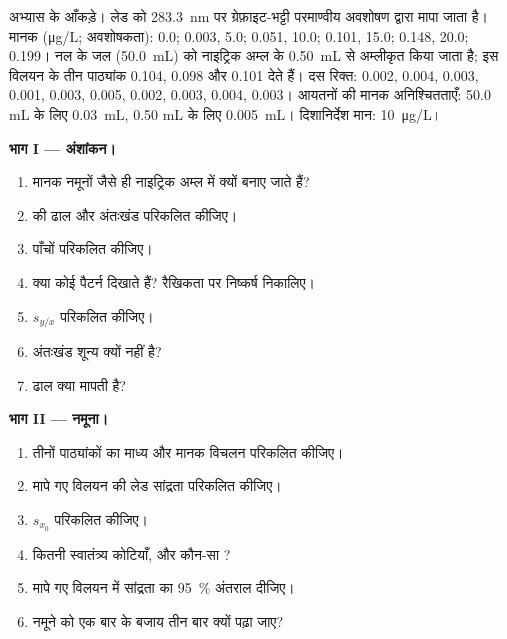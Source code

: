 \begin{problem}
\label{pb:b2:measurement-statistics:1}
अभ्यास के आँकड़े। लेड को \qty{283.3}{nm} पर ग्रेफ़ाइट-भट्टी परमाण्वीय अवशोषण द्वारा मापा जाता है। मानक
(\unit{\micro g/L}; अवशोषकता): 0.0; 0.003, 5.0; 0.051, 10.0; 0.101, 15.0; 0.148, 20.0; 0.199। नल
के जल (\qty{50.0}{mL}) को नाइट्रिक अम्ल के \qty{0.50}{mL} से अम्लीकृत किया जाता है; इस विलयन के तीन पाठ्यांक
0.104, 0.098 और 0.101 देते हैं। दस रिक्त: 0.002, 0.004, 0.003, 0.001, 0.003, 0.005, 0.002,
0.003, 0.004, 0.003। आयतनों की मानक अनिश्चितताएँ: 50.0 mL के लिए \qty{0.03}{mL},
0.50 mL के लिए \qty{0.005}{mL}। दिशानिर्देश मान: \qty{10}{\micro g/L}।

\medskip
\noindent\textbf{भाग I --- अंशांकन।}
\begin{enumerate}
  \item मानक नमूनों जैसे ही नाइट्रिक अम्ल में क्यों बनाए जाते हैं?
  \item {} की ढाल और अंतःखंड परिकलित कीजिए।
  \item पाँचों  परिकलित कीजिए।
  \item क्या  कोई पैटर्न दिखाते हैं? रैखिकता पर निष्कर्ष निकालिए।
  \item $s_{y/x}$ परिकलित कीजिए।
  \item अंतःखंड शून्य क्यों नहीं है?
  \item ढाल क्या मापती है?
\end{enumerate}

\medskip
\noindent\textbf{भाग II --- नमूना।}
\begin{enumerate}[resume]
  \item तीनों पाठ्यांकों का माध्य और मानक विचलन परिकलित कीजिए।
  \item मापे गए विलयन की लेड सांद्रता परिकलित कीजिए।
  \item $s_{x_0}$ परिकलित कीजिए।
  \item कितनी स्वातंत्र्य कोटियाँ, और कौन-सा ?
  \item मापे गए विलयन में सांद्रता का 95~\% अंतराल दीजिए।
  \item नमूने को एक बार के बजाय तीन बार क्यों पढ़ा जाए?
\end{enumerate}


\end{problem}
